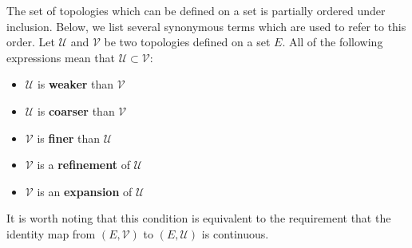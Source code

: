 \documentclass[12pt]{article}
\begin{document}
The set of topologies which can be defined on a set is partially ordered under inclusion.  Below, we list several synonymous terms which are used to refer to this order.  Let $\mathcal{U}$ and $\mathcal{V}$ be two topologies defined on a set $E$.  All of the following expressions mean that $\mathcal{U} \subset \mathcal{V}$:
\begin{itemize}
\item $\mathcal{U}$ is \textbf{weaker} than $\mathcal{V}$
\item $\mathcal{U}$ is \textbf{coarser} than $\mathcal{V}$
\item $\mathcal{V}$ is \textbf{finer} than $\mathcal{U}$
\item $\mathcal{V}$ is a \textbf{refinement} of $\mathcal{U}$
\item $\mathcal{V}$ is an \textbf{expansion} of $\mathcal{U}$
\end{itemize}

It is worth noting that this condition is equivalent to the requirement that  the identity map from $(E, \mathcal{V})$ to $(E, \mathcal{U})$ is continuous.
\end{document}
